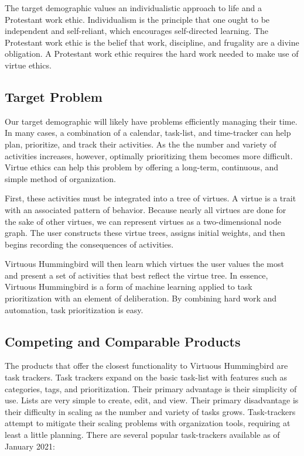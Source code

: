 \documentclass{article}
\begin{document}
The target demographic values an individualistic approach to life and a Protestant work ethic.
Individualism is the principle that one ought to be independent and self-reliant, which encourages self-directed learning.
The Protestant work ethic is the belief that work, discipline, and frugality are a divine obligation.
A Protestant work ethic requires the hard work needed to make use of virtue ethics.

\subsection{Target Problem}

Our target demographic will likely have problems efficiently managing their time.
In many cases, a combination of a calendar, task-list, and time-tracker can help plan, prioritize, and track their activities.
As the the number and variety of activities increases, however, optimally prioritizing them becomes more difficult.
Virtue ethics can help this problem by offering a long-term, continuous, and simple method of organization.

First, these activities must be integrated into a tree of virtues.
A virtue is a trait with an associated pattern of behavior.
Because nearly all virtues are done for the sake of other virtues, we can represent virtues as a two-dimensional node graph.
The user constructs these virtue trees, assigns initial weights, and then begins recording the consequences of activities.

Virtuous Hummingbird will then learn which virtues the user values the most and present a set of activities that best reflect the virtue tree.
In essence, Virtuous Hummingbird is a form of machine learning applied to task prioritization with an element of deliberation.
By combining hard work and automation, task prioritization is easy.

\subsection{Competing and Comparable Products}

The products that offer the closest functionality to Virtuous Hummingbird are task trackers.
Task trackers expand on the basic task-list with features such as categories, tags, and prioritization.
Their primary advantage is their simplicity of use.
Lists are very simple to create, edit, and view.
Their primary disadvantage is their difficulty in scaling as the number and variety of tasks grows.
Task-trackers attempt to mitigate their scaling problems with organization tools, requiring at least a little planning.
There are several popular task-trackers available as of January 2021:
\end{document}
